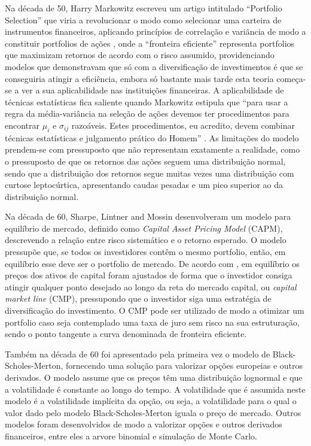 \documentclass[
  12pt,
  a4paper,
  openany]{book}
\begin{document}
Na década de 50, Harry Markowitz escreveu um artigo intitulado ``Portfolio Selection'' que viria a revolucionar o modo como selecionar uma carteira de instrumentos financeiros, aplicando princípios de correlação e variância de modo a constituir portfolios de ações , onde a ``fronteira eficiente'' representa portfolios que maximizam retornos de acordo com o risco assumido, providenciando modelos que demonstravam que só com a diversificação de investimentos é que se conseguiria atingir a eficiência, embora só bastante mais tarde esta teoria começa-se a ver a sua aplicabilidade nas instituições financeiras. A aplicabilidade de técnicas estatísticas fica saliente quando Markowitz estipula que ``para usar a regra da média-variância na seleção de ações devemos ter procedimentos para encontrar \(\mu_i\) e \(\sigma_{ij}\) razoáveis. Estes procedimentos, eu acredito, devem combinar técnicas estatísticas e julgamento prático do Homem'' \citep[pp.91]{Markowitz1952}. As limitações do modelo prendem-se com pressuposto que não representam exatamente a realidade, como o pressuposto de que os retornos das ações seguem uma distribuição normal, sendo que a distribuição dos retornos segue muitas vezes uma distribuição com curtose leptocúrtica, apresentando caudas pesadas e um pico superior ao da distribuição normal.

Na década de 60, Sharpe, Lintner and Mossin desenvolveram um modelo para equilíbrio de mercado, definido como \emph{Capital Asset Pricing Model} (CAPM), descrevendo a relação entre risco sistemático e o retorno esperado. O modelo pressupõe que, se todos os investidores contêm o mesmo portfolio, então, em equilíbrio esse deve ser o portfolio de mercado. De acordo com \citet{Sharpe1964}, em equilíbrio os preços dos ativos de capital foram ajustados de forma que o investidor consiga atingir qualquer ponto desejado ao longo da reta do mercado capital, ou \emph{capital market line} (CMP), pressupondo que o investidor siga uma estratégia de diversificação do investimento. O CMP pode ser utilizado de modo a otimizar um portfolio caso seja contemplado uma taxa de juro sem risco na sua estruturação, sendo o ponto tangente a curva denominada de fronteira eficiente.

Também na década de 60 foi apresentado pela primeira vez o modelo de Black-Scholes-Merton, fornecendo uma solução para valorizar opções europeias e outros derivados. O modelo assume que os preços têm uma distribuição lognormal e que a volatilidade é constante ao longo do tempo. A volatilidade que é assumida neste modelo é a volatilidade implícita da opção, ou seja, a volatilidade para o qual o valor dado pelo modelo Black-Scholes-Merton iguala o preço de mercado. Outros modelos foram desenvolvidos de modo a valorizar opções e outros derivados financeiros, entre eles a arvore binomial e simulação de Monte Carlo.
\end{document}
